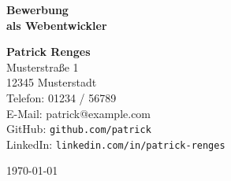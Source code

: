 \documentclass[a4paper,12pt]{article}
\begin{document}
\thispagestyle{empty} %

\begin{flushright}
\end{flushright}

\vspace*{2cm}

\begin{center}
  {\LARGE \textbf{Bewerbung}}\\[0.5cm]
  {\Large \textbf{als Webentwickler}} %
\end{center}

\vspace{2cm}

\noindent
\textbf{Patrick Renges} \\
Musterstraße 1 \\
12345 Musterstadt \\
Telefon: 01234 / 56789 \\
E-Mail: patrick@example.com \\
GitHub: \texttt{github.com/patrick} \\
LinkedIn: \texttt{linkedin.com/in/patrick-renges}

\vfill

\begin{flushright}
\today
\end{flushright}
\end{document}
